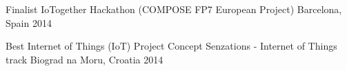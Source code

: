 
\begin{cvhonors}

  \cvhonor
    {Finalist} %
    {IoTogether Hackathon (COMPOSE FP7 European Project)} %
    {Barcelona, Spain} %
    {2014} %

  \cvhonor
    {Best Internet of Things (IoT) Project Concept} %
    {Senzations - Internet of Things track} %
    {Biograd na Moru, Croatia} %
    {2014} %

\end{cvhonors}
